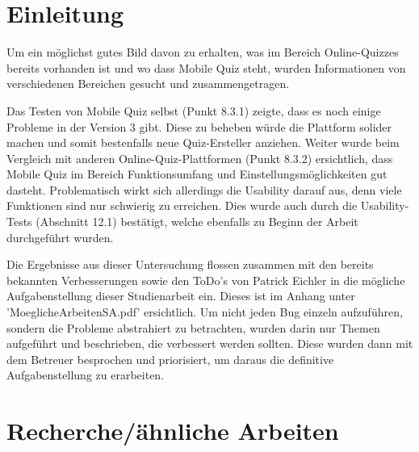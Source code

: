 





\section{Einleitung}

Um ein möglichst gutes Bild davon zu erhalten, was im Bereich Online-Quizzes bereits vorhanden ist und wo dass Mobile Quiz steht, wurden Informationen von verschiedenen Bereichen gesucht und zusammengetragen.


Das Testen von Mobile Quiz selbst (Punkt 8.3.1) zeigte, dass es noch einige Probleme in der Version 3 gibt. Diese zu beheben würde die Plattform solider machen und somit bestenfalls neue Quiz-Ersteller anziehen.
Weiter wurde beim Vergleich mit anderen Online-Quiz-Plattformen (Punkt 8.3.2) ersichtlich, dass Mobile Quiz im Bereich Funktionsumfang und Einstellungsmöglichkeiten gut dasteht. Problematisch wirkt sich allerdings die Usability darauf aus, denn viele Funktionen sind nur schwierig zu erreichen. Dies wurde auch durch die Usability-Tests (Abschnitt 12.1) bestätigt, welche ebenfalls zu Beginn der Arbeit durchgeführt wurden.

Die Ergebnisse aus dieser Untersuchung flossen zusammen mit den bereits bekannten Verbesserungen sowie den ToDo's von Patrick Eichler in die mögliche Aufgabenstellung dieser Studienarbeit ein. Dieses ist im Anhang unter 'MoeglicheArbeitenSA.pdf' ersichtlich. Um nicht jeden Bug einzeln aufzuführen, sondern die Probleme abstrahiert zu betrachten, wurden darin nur Themen aufgeführt und beschrieben, die verbessert werden sollten. Diese wurden dann mit dem Betreuer besprochen und priorisiert, um daraus die definitive Aufgabenstellung zu erarbeiten.

\section{Recherche/ähnliche Arbeiten}

